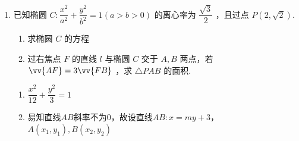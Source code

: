 \begin{enumerate}
\begin{enumerate}
\begin{jieda}
\begin{enumerate}
                将直线的参数方程代入到椭圆的标准方程中有$\left(\dfrac{1}{2} + t \cdot cos\alpha\right)^2 + 3\left(\dfrac{1}{2} + t \cdot sin\alpha\right)^2 = 3$
    
                整理得$(2sin^2\alpha + 1)t^2+(3sin\alpha+cos\alpha)t - 2 = 0$
    
                $\Delta > 0$，故有$\left\{\begin{array}{l}
                     t_1+t_2 = -\dfrac{3sin\alpha + cos\alpha}{2sin^2\alpha + 1} \\
                     t_1t_2 = -\dfrac{2}{2sin^2\alpha + 1}
                \end{array}\right.$
    
                $\dfrac{|PA|}{|QA|} = \dfrac{1}{2} \Longleftrightarrow \dfrac{t_1}{t_2} = -\dfrac{1}{2}$，故$\dfrac{t_2}{t_1} = -2$，因此$\dfrac{t_1}{t_2} + \dfrac{t_2}{t_1} = \dfrac{t_1^2+t_2^2}{t_1t_2} = \dfrac{(t_1+t_2)^2 - 2t_1t_2}{t_1t_2} = -\dfrac{5}{2}$
    
                $\dfrac{(t_1+t_2)^2 - 2t_1t_2}{t_1t_2} = \dfrac{(t_1+t_2)^2}{t_1t_2} - 2 = \dfrac{\left(-\dfrac{3sin\alpha + cos\alpha}{2sin^2\alpha + 1}\right)^2}{\left(-\dfrac{2}{2sin^2\alpha + 1}\right)} - 2 = -\dfrac{(3sin\alpha + cos\alpha)^2}{2(2sin^2\alpha + 1)} - 2 = -\dfrac{5}{2}$
    
                故$-\dfrac{(3sin\alpha + cos\alpha)^2}{2(2sin^2\alpha + 1)} = -\dfrac{1}{2}$，即$(2sin^2\alpha + 1) = (3sin\alpha + cos\alpha)^2$，即$2sin^2\alpha + 1 = 8sin^2\alpha + 6sin\alpha cos\alpha + 1$，故$6sin^2\alpha + 6sin\alpha cos\alpha = 0$，即$k^2+k = 0$，解得$k = -1$或$0$（舍），因此直线方程为$y = 1-x$.
            \end{enumerate}
        \end{jieda}

        \item 已知椭圆 $C : \dfrac{{x}^{2}}{{a}^{2}} + \dfrac{{y}^{2}}{{b}^{2}} = 1\left( {a > b > 0}\right)$ 的离心率为 $\dfrac{\sqrt{3}}{2}$ ，且过点 $P\left( {2,\sqrt{2}}\right)$.
        \begin{enumerate}
            \item 求椭圆 $C$ 的方程
            \item 过右焦点 $F$ 的直线 $l$ 与椭圆 $C$ 交于 $A,B$ 两点，若 $\vv{AF} = 3\vv{FB}$ ，求 $\bigtriangleup  {PAB}$ 的面积.
        \end{enumerate}
        \begin{jieda}
            \begin{enumerate}
                \item $\dfrac{x^2}{12}+\dfrac{y^2}{3} = 1$
                \item 易知直线$AB$斜率不为$0$，故设直线$AB: x = my + 3$，$A(x_1, y_1), B(x_2, y_2)$
                

\end{enumerate}
\end{jieda}
\end{enumerate}
\end{enumerate}
